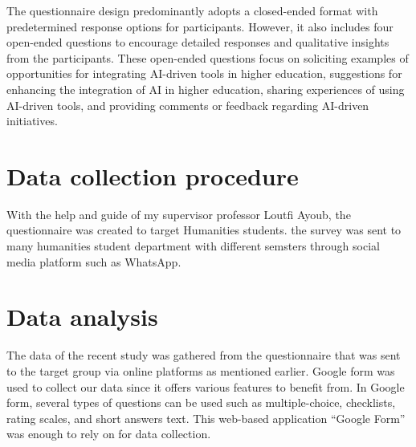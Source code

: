 The questionnaire design predominantly adopts a closed-ended format with predetermined
response options for participants. However, it also includes four open-ended questions
to encourage detailed responses and qualitative insights from the participants. These
open-ended questions focus on soliciting examples of opportunities for integrating AI-driven
tools in higher education, suggestions for enhancing the integration of AI in higher education,
sharing experiences of using AI-driven tools, and providing comments or feedback regarding AI-driven initiatives.
\section{Data collection procedure}
With the help and guide of my supervisor professor Loutfi Ayoub, the questionnaire was created to target Humanities students.
the survey was sent to many humanities student department with different semsters through social media platform such as WhatsApp.
\section{Data analysis}
The data of the recent study was gathered from the questionnaire that was sent to
the target group via online platforms as mentioned earlier. Google form was used to collect
our data since it offers various features to benefit from. In Google form, several types of
questions can be used such as multiple-choice, checklists, rating scales, and short answers
text. This web-based application “Google Form” was enough to rely on for data collection.
